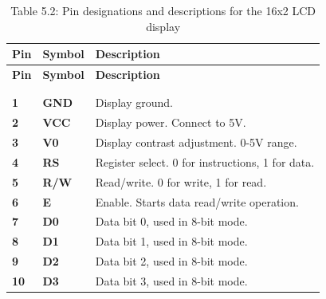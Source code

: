 \documentclass[
  9pt,
  letterpaper,
  abstract,
  titlepage]{scrbook}
\begin{document}
\label{table:16x2lcdpins}
\begin{longtable}[]{@{}
  >{\raggedright\arraybackslash}p{}
  >{\raggedright\arraybackslash}p{}
  >{\raggedright\arraybackslash}p{}@{}}
\toprule\noalign{}
\begin{minipage}[b]{\linewidth}\raggedright
\textbf{Pin}
\end{minipage} & \begin{minipage}[b]{\linewidth}\raggedright
\textbf{Symbol}
\end{minipage} & \begin{minipage}[b]{\linewidth}\raggedright
\textbf{Description}
\end{minipage} \\
\midrule\noalign{}
\endfirsthead
\toprule\noalign{}
\begin{minipage}[b]{\linewidth}\raggedright
\textbf{Pin}
\end{minipage} & \begin{minipage}[b]{\linewidth}\raggedright
\textbf{Symbol}
\end{minipage} & \begin{minipage}[b]{\linewidth}\raggedright
\textbf{Description}
\end{minipage} \\
\midrule\noalign{}
\endhead
\bottomrule\noalign{}
\tabularnewline
\caption{Table 5.2: Pin designations and descriptions for the 16x2 LCD
display}\tabularnewline
\endlastfoot
\textbf{1} & \textbf{GND} & Display ground. \\
\textbf{2} & \textbf{VCC} & Display power. Connect to 5V. \\
\textbf{3} & \textbf{V0} & Display contrast adjustment. 0-5V range. \\
\textbf{4} & \textbf{RS} & Register select. 0 for instructions, 1 for
data. \\
\textbf{5} & \textbf{R/W} & Read/write. 0 for write, 1 for read. \\
\textbf{6} & \textbf{E} & Enable. Starts data read/write operation. \\
\textbf{7} & \textbf{D0} & Data bit 0, used in 8-bit mode. \\
\textbf{8} & \textbf{D1} & Data bit 1, used in 8-bit mode. \\
\textbf{9} & \textbf{D2} & Data bit 2, used in 8-bit mode. \\
\textbf{10} & \textbf{D3} & Data bit 3, used in 8-bit mode. \\

\end{longtable}
\end{document}
